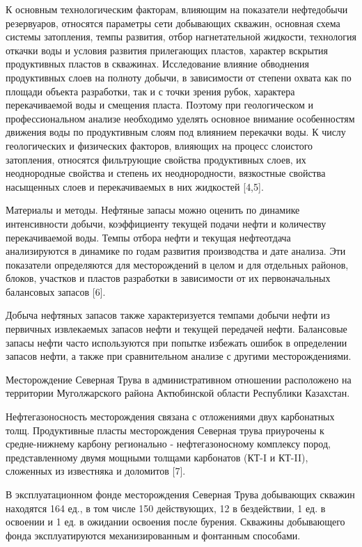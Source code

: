 К основным технологическим факторам, влияющим на показатели нефтедобычи
резервуаров, относятся параметры сети добывающих скважин, основная схема
системы затопления, темпы развития, отбор нагнетательной жидкости,
технология откачки воды и условия развития прилегающих пластов, характер
вскрытия продуктивных пластов в скважинах. Исследование влияние
обводнения продуктивных слоев на полноту добычи, в зависимости от
степени охвата как по площади объекта разработки, так и с точки зрения
рубок, характера перекачиваемой воды и смещения пласта. Поэтому при
геологическом и профессиональном анализе необходимо уделять основное
внимание особенностям движения воды по продуктивным слоям под влиянием
перекачки воды. К числу геологических и физических факторов, влияющих на
процесс слоистого затопления, относятся фильтрующие свойства
продуктивных слоев, их неоднородные свойства и степень их
неоднородности, вязкостные свойства насыщенных слоев и перекачиваемых в
них жидкостей {[}4,5{]}.

Материалы и методы. Нефтяные запасы можно оценить по динамике
интенсивности добычи, коэффициенту текущей подачи нефти и количеству
перекачиваемой воды. Темпы отбора нефти и текущая нефтеотдача
анализируются в динамике по годам развития производства и дате анализа.
Эти показатели определяются для месторождений в целом и для отдельных
районов, блоков, участков и пластов разработки в зависимости от их
первоначальных балансовых запасов {[}6{]}.

Добыча нефтяных запасов также характеризуется темпами добычи нефти из
первичных извлекаемых запасов нефти и текущей передачей нефти.
Балансовые запасы нефти часто используются при попытке избежать ошибок в
определении запасов нефти, а также при сравнительном анализе с другими
месторождениями.

Месторождение Северная Трува в административном отношении расположено на
территории Муголжарского района Актюбинской области Республики
Казахстан.

Нефтегазоносность месторождения связана с отложениями двух карбонатных
толщ. Продуктивные пласты месторождения Северная трува приурочены к
средне-нижнему карбону регионально - нефтегазоносному комплексу пород,
представленному двумя мощными толщами карбонатов (КТ-I и КТ-II),
сложенных из известняка и доломитов {[}7{]}.

В эксплуатационном фонде месторождения Северная Трува добывающих скважин
находятся 164 ед., в том числе 150 действующих, 12 в бездействии, 1 ед.
в освоении и 1 ед. в ожидании освоения после бурения. Скважины
добывающего фонда эксплуатируются механизированным и фонтанным
способами.

